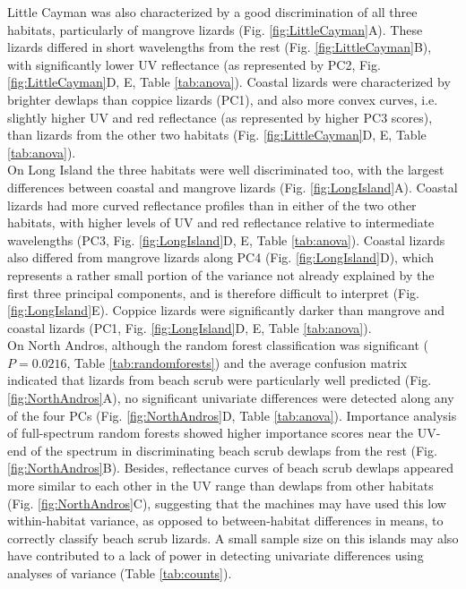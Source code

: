 Little Cayman was also characterized by a good discrimination of all three habitats, particularly of mangrove lizards (Fig. \ref{fig:LittleCayman}A). These lizards differed in short wavelengths from the rest (Fig. \ref{fig:LittleCayman}B), with significantly lower UV reflectance (as represented by PC2, Fig. \ref{fig:LittleCayman}D, E, Table \ref{tab:anova}). Coastal lizards were characterized by brighter dewlaps than coppice lizards (PC1), and also more convex curves, i.e. slightly higher UV and red reflectance (as represented by higher PC3 scores), than lizards from the other two habitats (Fig. \ref{fig:LittleCayman}D, E, Table \ref{tab:anova}).\\

On Long Island the three habitats were well discriminated too, with the largest differences between coastal and mangrove lizards (Fig. \ref{fig:LongIsland}A). Coastal lizards had more curved reflectance profiles than in either of the two other habitats, with higher levels of UV and red reflectance relative to intermediate wavelengths (PC3, Fig. \ref{fig:LongIsland}D, E, Table \ref{tab:anova}). Coastal lizards also differed from mangrove lizards along PC4 (Fig. \ref{fig:LongIsland}D), which represents a rather small portion of the variance not already explained by the first three principal components, and is therefore difficult to interpret (Fig. \ref{fig:LongIsland}E). Coppice lizards were significantly darker than mangrove and coastal lizards (PC1, Fig. \ref{fig:LongIsland}D, E, Table \ref{tab:anova}).\\ 

On North Andros, although the random forest classification was significant ($P = 0.0216$, Table \ref{tab:randomforests}) and the average confusion matrix indicated that lizards from beach scrub were particularly well predicted (Fig. \ref{fig:NorthAndros}A), no significant univariate differences were detected along any of the four PCs (Fig. \ref{fig:NorthAndros}D, Table \ref{tab:anova}). Importance analysis of full-spectrum random forests showed higher importance scores near the UV-end of the spectrum in discriminating beach scrub dewlaps from the rest (Fig. \ref{fig:NorthAndros}B). Besides, reflectance curves of beach scrub dewlaps appeared more similar to each other in the UV range than dewlaps from other habitats (Fig. \ref{fig:NorthAndros}C), suggesting that the machines may have used this low within-habitat variance, as opposed to between-habitat differences in means, to correctly classify beach scrub lizards. A small sample size on this islands may also have contributed to a lack of power in detecting univariate differences using analyses of variance (Table \ref{tab:counts}).\\

